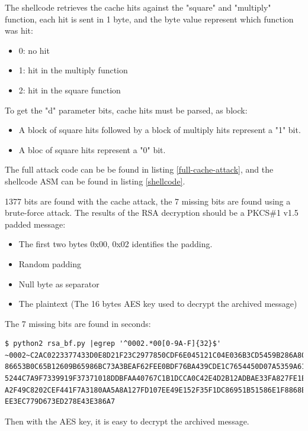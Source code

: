 \documentclass[a4paper]{article}
\begin{document}
The shellcode retrieves the cache hits against the "square" and "multiply" function, each hit is sent in 1 byte, and the byte value represent which function was hit:
\begin{itemize}
    \item 0: no hit
    \item 1: hit in the multiply function
    \item 2: hit in the square function
\end{itemize}

To get the "d" parameter bits, cache hits must be parsed, as block:
\begin{itemize}
    \item A block of square hits followed by a block of multiply hits represent a "1" bit.
    \item A bloc of square hits represent a "0" bit.
\end{itemize}
\newpage
The full attack code can be be found in listing \ref{full-cache-attack}, and the shellcode ASM can be found in listing \ref{shellcode}.

1377 bits are found with the cache attack, the 7 missing bits are found using a brute-force attack.
The results of the RSA decryption should be a PKCS\#1 v1.5 padded message:
\begin{itemize}
    \item The first two bytes 0x00, 0x02 identifies the padding.
    \item Random padding
    \item Null byte as separator
    \item The plaintext (The 16 bytes AES key used to decrypt the archived message)
\end{itemize}

The 7 missing bits are found in seconds:

\begin{lstlisting}[caption={Bruteforcing missing bits (see listing \ref{BF_RSA})},numbers=none,style=colortilde]
$ python2 rsa_bf.py |egrep '^0002.*00[0-9A-F]{32}$'
~0002~C2AC0223377433D0E8D21F23C2977850CDF6E045121C04E036B3CD5459B286A80ED3BE325573
86653B0C65B12609B65986BC73A3BEAF62FEE0BDF76BA439CDE1C7654450D07A5359A6169F8D795F
5244C7A9F7339919F37371018DDBFAA40767C1B1DCCA0C42E4D2B12ADBAE33FA827FE1E8406F4E16
A2F49C8202CEF441F7A3180AA5A8A127FD107EE49E152F35F1DC86951B51586E1F8868E3~00~93AF8C
EE3EC779D673ED278E43E386A7
\end{lstlisting}

Then with the AES key, it is easy to decrypt the archived message.
\end{document}
